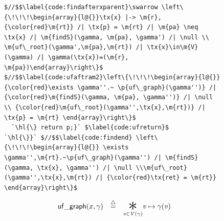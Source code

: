 \documentclass[acmsmall,screen]{acmart}  %
\newcommand{\defeq}{\mathbin{\stackrel{\triangle}{=}}} %
\newcommand{\tx}[1]{\text{#1}}
\newcommand{\p}[1]{\ensuremath{\mathsf{#1}}} \newcommand{\m}[1]{\ensuremath{\mathit{#1}}} \newcommand{\ma}[1]{\ensuremath{\mathcal{#1}}} \let\ramify\lightning
\newcommand{\hl}[1]{\colorbox{lightgray}{#1}} %
\providecommand{\DIFadd}[1]{{\protect\color{blue}\uwave{#1}}} %
\providecommand{\DIFaddFL}[1]{\DIFadd{#1}} %
\providecommand{\DIFaddbeginFL}{} %
\providecommand{\DIFaddendFL}{} %
\providecommand{\DIFdelbeginFL}{} %
\providecommand{\DIFdelendFL}{} %
\newcommand{\DIFscaledelfig}{0.5}
\newlength{\DIFdelgraphicswidth} %
\newlength{\DIFdelgraphicsheight} %
\newcommand{\DIFaddincludegraphics}[2][]{{\color{blue}\fbox{\DIFOincludegraphics[#1]{#2}}}} %
\newcommand{\DIFdelincludegraphics}[2][]{%
\sbox{\DIFdelgraphicsbox}{\DIFOincludegraphics[#1]{#2}}%
\settoboxwidth{\DIFdelgraphicswidth}{\DIFdelgraphicsbox} %
\settoboxtotalheight{\DIFdelgraphicsheight}{\DIFdelgraphicsbox} %
\scalebox{\DIFscaledelfig}{%
\parbox[b]{\DIFdelgraphicswidth}{\usebox{\DIFdelgraphicsbox}\\[-\baselineskip] \rule{\DIFdelgraphicswidth}{0em}}\llap{\resizebox{\DIFdelgraphicswidth}{\DIFdelgraphicsheight}{%
\setlength{\unitlength}{\DIFdelgraphicswidth}%
\begin{picture}(1,1)%
\thicklines\linethickness{2pt} %
{\color[rgb]{1,0,0}\put(0,0){\framebox(1,1){}}}%
{\color[rgb]{1,0,0}\put(0,0){\line( 1,1){1}}}%
{\color[rgb]{1,0,0}\put(0,1){\line(1,-1){1}}}%
\end{picture}%
}\hspace*{3pt}}} %
} %
\DeclareRobustCommand{\DIFaddbeginFL}{\DIFOaddbeginFL \let\includegraphics\DIFaddincludegraphics} %
\DeclareRobustCommand{\DIFaddendFL}{\DIFOaddendFL \let\includegraphics\DIFOincludegraphics} %
\DeclareRobustCommand{\DIFdelbeginFL}{\DIFOdelbeginFL \let\includegraphics\DIFdelincludegraphics} %
\DeclareRobustCommand{\DIFdelendFL}{\DIFOaddendFL \let\includegraphics\DIFOincludegraphics} %
\begin{document}
\begin{figure}[t]
\begin{lstlisting}[multicols=2]
$//$$\label{code:findafterxparent}\swarrow \left\{\!\!\!\begin{array}{l@{}}\tx{x} |-> \m{r},{\color{red}\m{rt}} /| \tx{p} = \m{rt} /| \m{pa} \neq \tx{x} /| \m{findS}(\gamma, \m{pa}, \gamma') /| \null \\ \m{uf\_root}(\gamma',\m{pa},\m{rt}) /| \tx{x}\in\m{V}(\gamma) /| \gamma(\tx{x})=(\m{r}, \m{pa})\end{array}\right\}$
$//$$\label{code:ufaftram2}\left\{\!\!\!\begin{array}{l@{}} {\color{red}\exists \gamma''.~ \p{uf\_graph}(\gamma'')} /| {\color{red}\m{findS}(\gamma, \m{pa}, \gamma'')} /| \null \\ {\color{red}\m{uf\_root}(\gamma'',\tx{x},\m{rt})} /| \tx{p} = \m{rt} \end{array}\right\}$
  `\hl{\} return p;}` $\label{code:ufreturn}$
`\hl{\}}` $//$$\label{code:findend} \left\{\!\!\!\begin{array}{l@{}} \exists \gamma'',\m{rt}.~\p{uf\_graph}(\gamma'') /| \m{findS}(\gamma, \tx{x}, \gamma'') /| \null \\\m{uf\_root}(\gamma'',\tx{x},\m{rt}) /| {\color{red}\tx{ret} = \m{rt}}  \end{array}\right\}$
\end{lstlisting}
\DIFaddendFL \vspace*{-1ex}
{\footnotesize
\begin{flushleft}
\DIFaddbeginFL \DIFaddFL{\hspace{-3em}
}\DIFaddendFL \begin{minipage}[c]{0.46\textwidth}
\vspace*{-1ex}
\begin{equation*}
\label{eqn:ufgraphdefn}
\DIFdelbeginFL %
\DIFdelendFL \DIFaddbeginFL \begin{array}{@{}l@{}lcl@{}}
\multicolumn{2}{r}{\p{uf\_graph}(x, \gamma)} & \defeq & \underset{\m{v} \in \m{V}(\gamma)}{\bigstar} \m{v}	\mapsto\gamma(\m{v}) \\

\end{array}
\end{equation*}
\end{minipage}
\end{flushleft}}
\end{figure}
\end{document}
